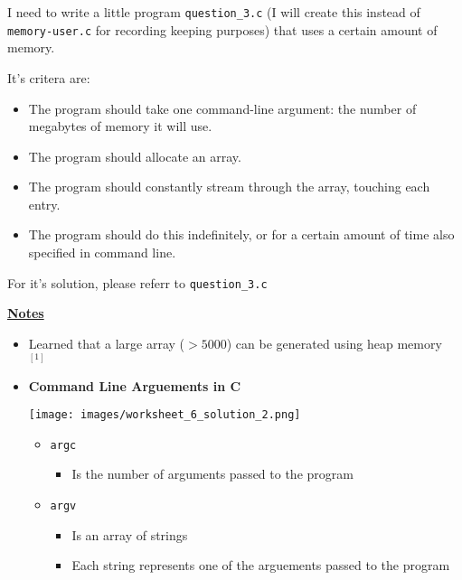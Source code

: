 \documentclass[12pt]{article}
\begin{document}
\begin{enumerate}[1.]
    I need to write a little program \texttt{question\_3.c} (I will create this instead of
    \texttt{memory-user.c} for recording keeping purposes) that uses a certain amount of memory.

    \bigskip

    It's critera are:

    \begin{itemize}
        \item The program should take one command-line argument: the number of megabytes of memory it will use.
        \item The program should allocate an array.
        \item The program should constantly stream through the array, touching each entry.
        \item The program should do this indefinitely, or for a certain amount of time also specified in command line.
    \end{itemize}

    \bigskip

    For it's solution, please referr to \texttt{question\_3.c}

    \bigskip

    \underline{\textbf{Notes}}

    \begin{itemize}
        \item Learned that a large array ($> 5000$) can be generated using heap
        memory $^{[1]}$


        \item \textbf{Command Line Arguements in C}

        \begin{center}
        \texttt{[image: images/worksheet\_6\_solution\_2.png]}
        \end{center}

        \begin{itemize}
            \item \texttt{argc}
            \begin{itemize}
                \item Is the number of arguments passed to the program
            \end{itemize}
            \item \texttt{argv}
            \begin{itemize}
                \item Is an array of strings
                \item Each string represents one of the arguements passed to the program
            \end{itemize}


\end{itemize}
\end{itemize}
\end{enumerate}
\end{document}

